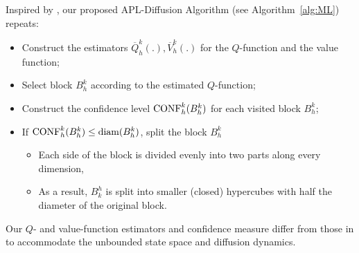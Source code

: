 \documentclass[final,supplement]{siamart251216}
\begin{document}
Inspired by \cite{sinclair2023adaptive}, our proposed APL-Diffusion Algorithm (see Algorithm~\ref{alg:ML}) repeats:
\begin{itemize}
    \item Construct the estimators $\overline{Q}_{h}^k(.), \overline{V}_h^k(.)$ for the $Q$-function and the value function;
    \item Select block $B_h^k$ according to the estimated $Q$-function;
    \item Construct the confidence level ${\rm CONF}_h^k(B_h^k)$ for each visited block $B_h^k$;
    \item If ${\rm CONF}_h^k(B_h^k)\leq {\rm diam}(B_h^k)$, split the block $B_h^k$ 
    \begin{itemize}
        \item Each side of the block is divided evenly into two parts along every dimension,

\item As a result, $B_k^h$ is split into smaller (closed) hypercubes with half the diameter of the original block.
    \end{itemize}
\end{itemize}
Our $Q$- and value-function estimators and confidence measure differ from
those in \cite{sinclair2023adaptive} to accommodate the unbounded state
space and diffusion dynamics.

\end{document}
